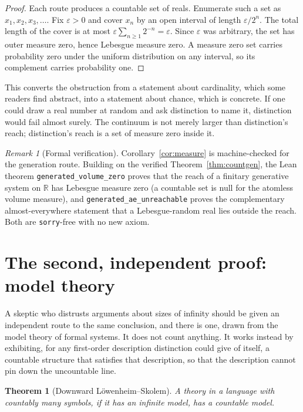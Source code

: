 \documentclass[11pt,a4paper]{article}
\newtheorem{theorem}{Theorem}[section]
\theoremstyle{definition}
\theoremstyle{remark}
\newtheorem*{remark}{Remark}
\begin{document}
\begin{proof}
Each route produces a countable set of reals. Enumerate such a set as
$x_1, x_2, x_3, \dots$. Fix $\varepsilon > 0$ and cover $x_n$ by an open interval
of length $\varepsilon / 2^{n}$. The total length of the cover is at most
$\varepsilon \sum_{n \geq 1} 2^{-n} = \varepsilon$. Since $\varepsilon$ was
arbitrary, the set has outer measure zero, hence Lebesgue measure zero. A measure
zero set carries probability zero under the uniform distribution on any interval,
so its complement carries probability one.
\end{proof}

This converts the obstruction from a statement about cardinality, which some
readers find abstract, into a statement about chance, which is concrete. If one
could draw a real number at random and ask distinction to name it, distinction
would fail almost surely. The continuum is not merely larger than distinction's
reach; distinction's reach is a set of measure zero inside it.

\begin{remark}[Formal verification]
Corollary~\ref{cor:measure} is machine-checked for the generation route. Building
on the verified Theorem~\ref{thm:countgen}, the Lean theorem
\verb|generated_volume_zero| proves that the reach of a finitary generative system
on $\mathbb R$ has Lebesgue measure zero (a countable set is null for the atomless
volume measure), and \verb|generated_ae_unreachable| proves the complementary
almost-everywhere statement that a Lebesgue-random real lies outside the reach.
Both are \verb|sorry|-free with no new axiom.
\end{remark}

\section{The second, independent proof: model theory}\label{sec:modeltheory}

A skeptic who distrusts arguments about sizes of infinity should be given an
independent route to the same conclusion, and there is one, drawn from the model
theory of formal systems. It does not count anything. It works instead by
exhibiting, for any first-order description distinction could give of itself, a
countable structure that satisfies that description, so that the description
cannot pin down the uncountable line.

\begin{theorem}[Downward L\"owenheim--Skolem]\label{thm:ls}
A theory in a language with countably many symbols, if it has an infinite model,
has a countable model.
\end{theorem}
\end{document}
